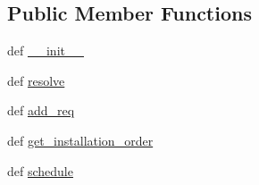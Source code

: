 \subsection*{Public Member Functions}
\begin{DoxyCompactItemize}
\item 
def \hyperlink{classpip_1_1__internal_1_1resolution_1_1legacy_1_1resolver_1_1Resolver_a803195f5b506b9c29324013cafa4b20b}{\+\_\+\+\_\+init\+\_\+\+\_\+}
\item 
def \hyperlink{classpip_1_1__internal_1_1resolution_1_1legacy_1_1resolver_1_1Resolver_a0d6327781becf0c449d18e4c27601c37}{resolve}
\item 
def \hyperlink{classpip_1_1__internal_1_1resolution_1_1legacy_1_1resolver_1_1Resolver_a0b94f8dd5173c6771bcd2840ab77bb36}{add\+\_\+req}
\item 
def \hyperlink{classpip_1_1__internal_1_1resolution_1_1legacy_1_1resolver_1_1Resolver_a39c8f6cb3a94a65f3d4c2dc0aa16abe6}{get\+\_\+installation\+\_\+order}
\item 
def \hyperlink{classpip_1_1__internal_1_1resolution_1_1legacy_1_1resolver_1_1Resolver_a165337424f582f0db50f4405c6e3e554}{schedule}
\end{DoxyCompactItemize}

